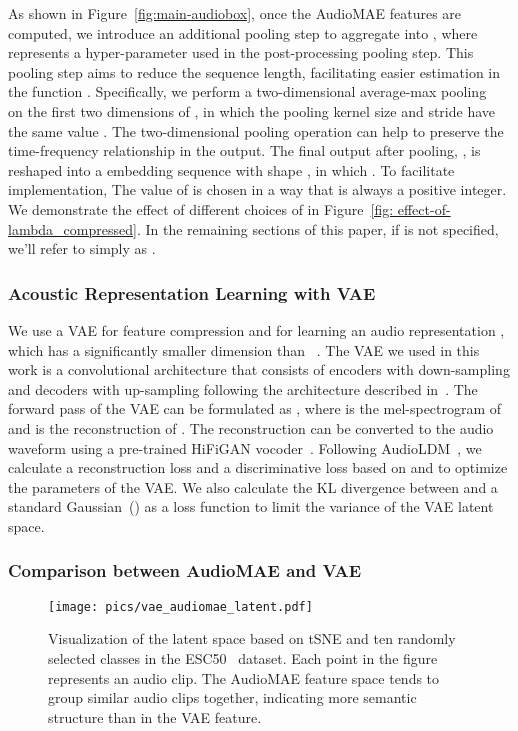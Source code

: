 \documentclass[lettersize,journal]{IEEEtran}
\begin{document}
As shown in Figure~\ref{fig:main-audiobox}, once the AudioMAE features  are computed, we introduce an additional pooling step to aggregate  into , where  represents a hyper-parameter used in the post-processing pooling step. This pooling step aims to reduce the sequence length, facilitating easier estimation in the function .
Specifically, we perform a two-dimensional average-max pooling~\cite{liu2023simple} on the first two dimensions of , in which the pooling kernel size and stride have the same value . 
The two-dimensional pooling operation can help to preserve the time-frequency relationship in the output. 
The final output after pooling, , is reshaped into a embedding sequence with shape , in which . To facilitate implementation, The value of  is chosen in a way that  is always a positive integer. We demonstrate the effect of different choices of  in Figure~\ref{fig: effect-of-lambda_compressed}. In the remaining sections of this paper, if  is not specified, we'll refer to  simply as .

\subsubsection{Acoustic Representation Learning with VAE}  

We use a VAE for feature compression and for learning an audio representation , which has a significantly smaller dimension than ~\cite{liu2023audioldm}. The VAE we used in this work is a convolutional architecture that consists of encoders with down-sampling and decoders with up-sampling following the architecture described in~\cite{liu2023audioldm}. The forward pass of the VAE can be formulated as , where  is the mel-spectrogram of  and  is the reconstruction of . The reconstruction  can be converted to the audio waveform  using a pre-trained HiFiGAN vocoder~\cite{kong2020hifi}. Following AudioLDM~\cite{liu2023audioldm}, we calculate a reconstruction loss and a discriminative loss based on  and  to optimize the parameters of the VAE. We also calculate the KL divergence between  and a standard Gaussian~() as a loss function to limit the variance of the VAE latent space.



\subsubsection{Comparison between AudioMAE and VAE} 

\begin{figure}
    \centering
    \texttt{[image: pics/vae\_audiomae\_latent.pdf]}
    \caption{Visualization of the latent space based on tSNE and ten randomly selected classes in the ESC50~\cite{piczak2015esc} dataset. Each point in the figure represents an audio clip. The AudioMAE feature space tends to group similar audio clips together, indicating more semantic structure than in the VAE feature.}
    \label{fig:tsne-comparison-visualization}
\end{figure}
\end{document}
